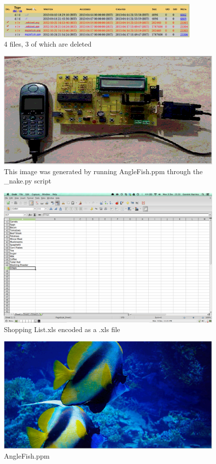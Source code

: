 \documentclass[12pt]{article}
\begin{document}
				\begin{figure}[ht!]
					\centering
					\includegraphics[width=10cm]{Images/4files.png}
					\caption{4 files, 3 of which are deleted}
				\end{figure}

				\begin{figure}[ht!]
					\centering
					\includegraphics[width=12cm]{Images/decrypt.png}
					\caption{This image was generated by running AngleFish.ppm through the \_nake.py script}
				\end{figure}
				
				\begin{figure}[ht!]
					\centering
					\includegraphics[width=12cm]{Images/ShoppingListExcel.png}
					\caption{Shopping List.xls encoded as a .xls file}
				\end{figure}
				
				\begin{figure}[ht!]
					\centering
					\includegraphics[width=12cm]{Images/AngleFishPpm.png}
					\caption{AngleFish.ppm}
				\end{figure}
\end{document}
